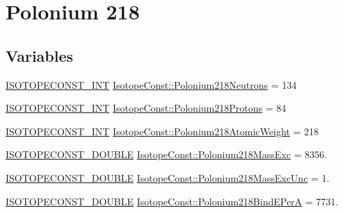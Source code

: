 \hypertarget{group___isotope_const-_polonium-_po218}{}\section{Polonium 218}
\label{group___isotope_const-_polonium-_po218}
\subsection*{Variables}
\begin{DoxyCompactItemize}
\item 
\mbox{\hyperlink{group___isotope_const-_macros_ga5f18360b3e99483a35c32d789e62621c}{I\+S\+O\+T\+O\+P\+E\+C\+O\+N\+S\+T\+\_\+\+I\+NT}} \mbox{\hyperlink{group___isotope_const-_polonium-_po218_ga6cf52eb86a343683831b6c700f80f3d0}{Isotope\+Const\+::\+Polonium218\+Neutrons}} = 134
\item 
\mbox{\hyperlink{group___isotope_const-_macros_ga5f18360b3e99483a35c32d789e62621c}{I\+S\+O\+T\+O\+P\+E\+C\+O\+N\+S\+T\+\_\+\+I\+NT}} \mbox{\hyperlink{group___isotope_const-_polonium-_po218_ga956953c08159d6945bf2e7cf855d42f8}{Isotope\+Const\+::\+Polonium218\+Protons}} = 84
\item 
\mbox{\hyperlink{group___isotope_const-_macros_ga5f18360b3e99483a35c32d789e62621c}{I\+S\+O\+T\+O\+P\+E\+C\+O\+N\+S\+T\+\_\+\+I\+NT}} \mbox{\hyperlink{group___isotope_const-_polonium-_po218_gaaf08ad4776845b837fb2214cd8662c7a}{Isotope\+Const\+::\+Polonium218\+Atomic\+Weight}} = 218
\item 
\mbox{\hyperlink{group___isotope_const-_macros_ga8f45a7272ce02c0b4c65c44636ed719a}{I\+S\+O\+T\+O\+P\+E\+C\+O\+N\+S\+T\+\_\+\+D\+O\+U\+B\+LE}} \mbox{\hyperlink{group___isotope_const-_polonium-_po218_ga49eefa84f520649933f3097936bb9a51}{Isotope\+Const\+::\+Polonium218\+Mass\+Exc}} = 8356.
\item 
\mbox{\hyperlink{group___isotope_const-_macros_ga8f45a7272ce02c0b4c65c44636ed719a}{I\+S\+O\+T\+O\+P\+E\+C\+O\+N\+S\+T\+\_\+\+D\+O\+U\+B\+LE}} \mbox{\hyperlink{group___isotope_const-_polonium-_po218_gaffc1e7072bc570f4047bbef14400ab56}{Isotope\+Const\+::\+Polonium218\+Mass\+Exc\+Unc}} = 1.
\item 
\mbox{\hyperlink{group___isotope_const-_macros_ga8f45a7272ce02c0b4c65c44636ed719a}{I\+S\+O\+T\+O\+P\+E\+C\+O\+N\+S\+T\+\_\+\+D\+O\+U\+B\+LE}} \mbox{\hyperlink{group___isotope_const-_polonium-_po218_gab4ccc832637f257feef1b81854a4e827}{Isotope\+Const\+::\+Polonium218\+Bind\+E\+PerA}} = 7731.
\item 

\end{DoxyCompactItemize}

